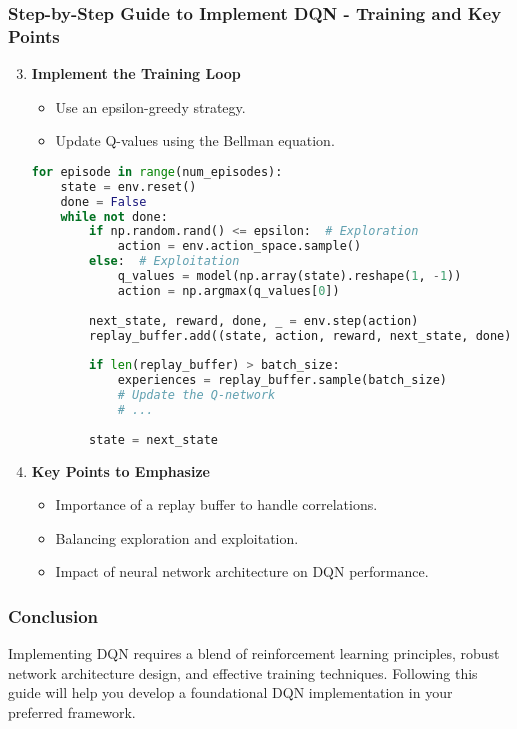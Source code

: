 \documentclass[aspectratio=169]{beamer}
\begin{document}
\begin{frame}[fragile]
    \frametitle{Step-by-Step Guide to Implement DQN - Training and Key Points}
    \begin{enumerate}
        \setcounter{enumi}{2}
        \item \textbf{Implement the Training Loop}
        \begin{itemize}
            \item Use an epsilon-greedy strategy.
            \item Update Q-values using the Bellman equation.
        \end{itemize}

        \begin{lstlisting}[language=Python]
for episode in range(num_episodes):
    state = env.reset()
    done = False
    while not done:
        if np.random.rand() <= epsilon:  # Exploration
            action = env.action_space.sample()
        else:  # Exploitation
            q_values = model(np.array(state).reshape(1, -1))
            action = np.argmax(q_values[0])
        
        next_state, reward, done, _ = env.step(action)
        replay_buffer.add((state, action, reward, next_state, done))
        
        if len(replay_buffer) > batch_size:
            experiences = replay_buffer.sample(batch_size)
            # Update the Q-network
            # ...
        
        state = next_state
        \end{lstlisting}

        \item \textbf{Key Points to Emphasize}
        \begin{itemize}
            \item Importance of a replay buffer to handle correlations.
            \item Balancing exploration and exploitation.
            \item Impact of neural network architecture on DQN performance.
        \end{itemize}
    \end{enumerate}
\end{frame}

\begin{frame}
    \frametitle{Conclusion}
    Implementing DQN requires a blend of reinforcement learning principles, robust network architecture design, and effective training techniques. Following this guide will help you develop a foundational DQN implementation in your preferred framework.
\end{frame}
\end{document}
